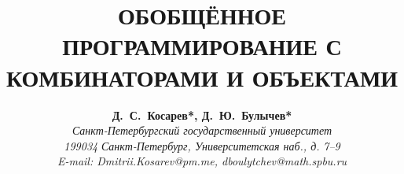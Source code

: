 \documentclass[a4paper,twoside,11pt]{article}
\author{
{\bfseries Д.~С.~Косарев*, Д.~Ю.~Булычев*}
\\ {\itshape Санкт-Петербургский государственный университет}
\\ {\slshape 199034} {\itshape  Санкт-Петербург, Университетская наб., д.} {\slshape  7–9}
\\ {\itshape E-mail: Dmitrii.Kosarev@pm.me, dboulytchev@math.spbu.ru}}
\title{ОБОБЩЁННОЕ ПРОГРАММИРОВАНИЕ С КОМБИНАТОРАМИ И ОБЪЕКТАМИ}
\date{}
\numberwithin{equation}{section}
\begin{document}
\maketitle
\setcounter{page}{3}


%









\label{lastpage}
\end{document}
